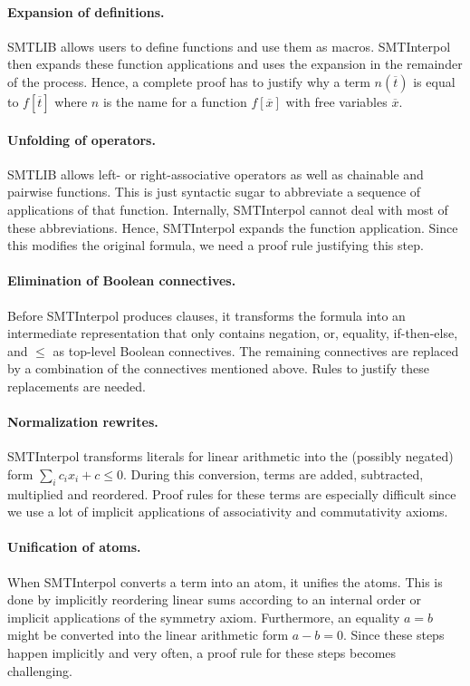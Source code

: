 \documentclass[a4paper]{article}
\newcommand\si{SMTInterpol\xspace}
\begin{document}
\paragraph{Expansion of definitions.}  SMTLIB allows users to define functions
and use them as macros.  \si then expands these function applications and uses
the expansion in the remainder of the process.  Hence, a complete proof has to
justify why a term $n(\overline{t})$ is equal to $f[\overline{t}]$ where $n$
is the name for a function $f[\overline{x}]$ with free variables
$\overline{x}$.

\paragraph{Unfolding of operators.}  SMTLIB allows left- or right-associative
operators as well as chainable and pairwise functions.  This is just syntactic
sugar to abbreviate a sequence of applications of that function.  Internally,
\si cannot deal with most of these abbreviations.  Hence, \si expands the
function application.  Since this modifies the original formula, we need
a proof rule justifying this step.

\paragraph{Elimination of Boolean connectives.}  Before \si produces clauses,
it transforms the formula into an intermediate representation that only
contains negation, or, equality, if-then-else, and $\leq$ as top-level Boolean
connectives.  The remaining connectives are replaced by a combination of the
connectives mentioned above.  Rules to justify these replacements are needed.

\paragraph{Normalization rewrites.}  \si transforms literals for linear
arithmetic into the (possibly negated) form $\sum_i c_i x_i + c\leq 0$.
During this conversion, terms are added, subtracted, multiplied and reordered.
Proof rules for these terms are especially difficult since we use a lot of
implicit applications of associativity and commutativity axioms.

\paragraph{Unification of atoms.}  When \si converts a term into an atom, it
unifies the atoms.  This is done by implicitly reordering linear sums
according to an internal order or implicit applications of the symmetry
axiom.  Furthermore, an equality $a=b$ might be converted into the linear
arithmetic form $a-b=0$.  Since these steps happen implicitly and very often,
a proof rule for these steps becomes challenging.
\end{document}
